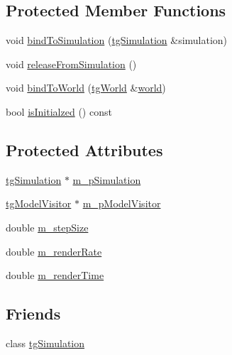 \subsection*{Protected Member Functions}
\begin{DoxyCompactItemize}
\item 
void \hyperlink{classtg_sim_view_a59e394221f148b53c44b4e3fad63c24e}{bind\-To\-Simulation} (\hyperlink{classtg_simulation}{tg\-Simulation} \&simulation)
\item 
void \hyperlink{classtg_sim_view_a8be0601b92a91c6f2bd1b519c9d68094}{release\-From\-Simulation} ()
\item 
void \hyperlink{classtg_sim_view_a6574a330b0123ebdfd8573b431c785c8}{bind\-To\-World} (\hyperlink{classtg_world}{tg\-World} \&\hyperlink{classtg_sim_view_a349682d852193ee75f416ab07c2d4a62}{world})
\item 
bool \hyperlink{classtg_sim_view_ae0154bfc6695adbc59116c1455e968e9}{is\-Initialzed} () const 
\end{DoxyCompactItemize}
\subsection*{Protected Attributes}
\begin{DoxyCompactItemize}
\item 
\hyperlink{classtg_simulation}{tg\-Simulation} $\ast$ \hyperlink{classtg_sim_view_a5e1b7f8fee44f02f76f8b32e3bd49d81}{m\-\_\-p\-Simulation}
\item 
\hyperlink{classtg_model_visitor}{tg\-Model\-Visitor} $\ast$ \hyperlink{classtg_sim_view_a4f19b09ac8cc273071fb5f7ff5e59a6b}{m\-\_\-p\-Model\-Visitor}
\item 
double \hyperlink{classtg_sim_view_a150d4c27a7a07d538aa405407e6ec239}{m\-\_\-step\-Size}
\item 
double \hyperlink{classtg_sim_view_a94f30c9f4a98a01c7171de6d7d00e92a}{m\-\_\-render\-Rate}
\item 
double \hyperlink{classtg_sim_view_af9665b86a366fc966bedf3f11fc1917d}{m\-\_\-render\-Time}
\end{DoxyCompactItemize}
\subsection*{Friends}
\begin{DoxyCompactItemize}
\item 
class \hyperlink{classtg_sim_view_a9473086ed839a9a46ce8699e37468c71}{tg\-Simulation}
\end{DoxyCompactItemize}


